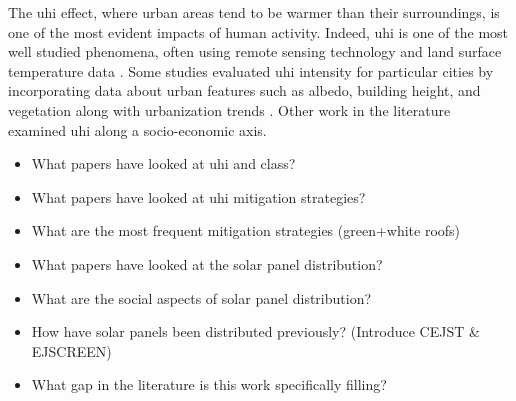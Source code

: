 The \ac{uhi} effect, where urban areas tend to be warmer than their surroundings,
is one of the most evident impacts of human activity. Indeed, \ac{uhi} is one of
the most well studied phenomena, often using remote sensing technology and land
surface temperature data \cite{almeida_study_2021, cotlier_extreme_2022}.
Some studies evaluated \ac{uhi} intensity for particular cities by incorporating
data about urban features such as albedo, building height, and vegetation
\cite{sangiorgio_development_2020,abulibdeh_analysis_2021} along with urbanization
trends \cite{li_how_2021}. Other work in the literature examined \ac{uhi} along
a socio-economic axis.

\begin{itemize}
  \item What papers have looked at uhi and class?
  \item What papers have looked at uhi mitigation strategies?
  \item What are the most frequent mitigation strategies (green+white roofs)
  \item What papers have looked at the solar panel distribution?
  \item What are the social aspects of solar panel distribution?
  \item How have solar panels been distributed previously? (Introduce CEJST & EJSCREEN)
  \item What gap in the literature is this work specifically filling?
\end{itemize}




